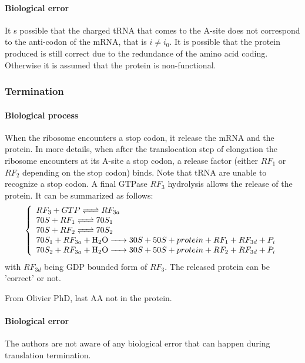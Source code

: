 \paragraph{Biological error} It s possible that the charged tRNA that comes to the A-site does not correspond to the anti-codon of the mRNA, that is $i\neq i_0$. It is possible that the protein produced is still correct due to the redundance of the amino acid coding. Otherwise it is assumed that the protein is non-functional.


\subsubsection{Termination}
\paragraph{Biological process} When the ribosome encounters a stop codon, it release the mRNA and the protein. In more details, when after the translocation step of elongation the ribosome encounters at its A-site a stop codon, a release factor (either $RF_1$ or $RF_2$ depending on the stop codon) binds. Note that tRNA are unable to recognize a stop codon. A final GTPase $RF_3$ hydrolysis allows the release of the protein. It can be summarized as follows:
$$
  \left\{
    \begin{array}{l}
      \reactionRev{RF_3 + GTP}{RF_{3a}}{}{} \\
      \reactionRev{70S + RF_1}{70S_1}{}{} \\
      \reactionRev{70S + RF_2}{70S_2}{}{} \\
      \reactionIrr{70S_1 + RF_{3a} + \ce{H2O}}{30S + 50S + protein + RF_1 + RF_{3d} + P_i}{}{} \\
      \reactionIrr{70S_2 + RF_{3a} + \ce{H2O}}{30S + 50S + protein + RF_2 + RF_{3d} + P_i}{}{} \\
    \end{array}
  \right.
$$
with $RF_{3d}$ being GDP bounded form of $RF_3$. The released protein can be 'correct' or not.

\textcolor[rgb]{1.00,0.00,0.00}{From Olivier PhD, last AA not in the protein.}


\paragraph{Biological error} The authors are not aware of any biological error that can happen during translation termination.

